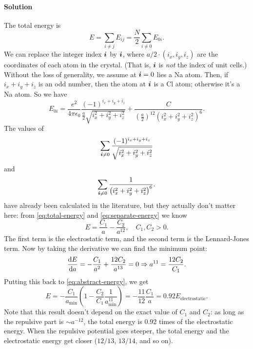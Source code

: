 \documentclass[hyperref, a4paper]{article}
\begin{document}
\paragraph{Solution} The total energy is 
\begin{equation}
    E = \sum_{i \neq j} E_{ij} = \frac{N}{2} \sum_{i \neq 0} E_{0i}.
    \label{eq:total-energy}
\end{equation}
We can replace the integer index $\vb*{i}$ by $\vb*{i}$,
where $ a /2 \cdot (i_x, i_y, i_z)$ are the coordinates of each atom in the crystal.
(That is, $\vb*{i}$ is \emph{not} the index of unit cells.)
Without the loss of generality,
we assume at $\vb*{i}=0$ lies a Na atom.
Then, if $i_x + i_y + i_z$ is an odd number,
then the atom at $\vb*{i}$ is a Cl atom; 
otherwise it's a Na atom.
So we have 
\begin{equation}
    E_{0i} = \frac{e^2}{4\pi \epsilon_0} \frac{(-1)^{i_x + i_y + i_z}}{\frac{a}{2} \sqrt{i_x^2 + i_y^2 + i_z^2}} 
    + \frac{C}{\left(\frac{a}{2}\right)^{12} \left( i_x^2 + i_y^2 + i_z^2 \right)^6}.
    \label{eq:separate-energy}
\end{equation}
The values of
\begin{equation}
    \sum_{\vb*{i} \neq 0} \frac{(-1)^{i_x + i_y + i_z}}{\sqrt{i_x^2 + i_y^2 + i_z^2}} 
    \label{eq:coefficient1}
\end{equation}
and 
\begin{equation}
    \sum_{\vb*{i} \neq 0} \frac{1}{ \left( i_x^2 + i_y^2 + i_z^2 \right)^6}.
    \label{eq:coefficient2}
\end{equation}
have already been calculated in the literature,
but they actually don't matter here:
from \eqref{eq:total-energy} and \eqref{eq:separate-energy} we know 
\begin{equation}
    E = \frac{C_1}{a} - \frac{C_2}{a^{12}}, \quad C_1, C_2 > 0.
    \label{eq:abstract-energy}
\end{equation}
The first term is the electrostatic term,
and the second term is the Lennard-Jones term.
Now by taking the derivative we can find the minimum point:
\[
    \dv{E}{a} = - \frac{C_1}{a^2} + \frac{12 C_2}{a^{13}} = 0 \Rightarrow a^{11} = \frac{12 C_2}{C_1}.
\]
Putting this back to \eqref{eq:abstract-energy}, we get 
\begin{equation}
    E = - \frac{C_1}{a_{\text{min}}} \left( 1 - \frac{C_2}{C_1} \frac{1}{a_{\text{min}}^{11}} \right) 
    = - \frac{11}{12} \frac{C_1}{a} = 0.92 E_{\text{electrostatic}}.
\end{equation}
Note that this result doesn't depend on the exact value of $C_1$ and $C_2$:
as long as the repulsive part is $\sim a^{-12}$,
the total energy is 0.92 times of the electrostatic energy.
When the repulsive potential goes steeper,
the total energy and the electrostatic energy get closer
($12/13$, $13/14$, and so on).
\end{document}
